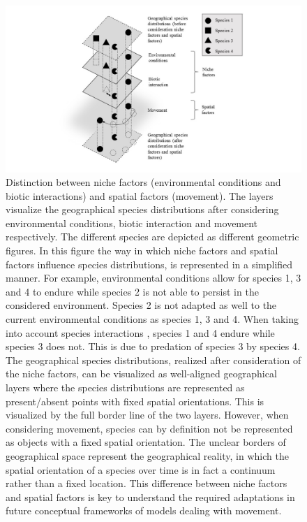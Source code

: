 \documentclass[12pt,authoryear]{elsarticle}
\begin{document}
\begin{figure}[!ht]
  \centering\includegraphics[scale=0.45]{Figure1}
  \caption{Distinction between niche factors (environmental conditions and biotic interactions) and spatial factors (movement). The layers visualize the geographical species distributions after considering environmental conditions, biotic interaction and movement respectively. The different species are depicted as different geometric figures. In this figure the way in which niche factors and spatial factors influence species distributions, is represented in a simplified manner. For example, environmental conditions allow for species 1, 3 and 4 to endure while species 2 is not able to persist in the considered environment. Species 2 is not adapted as well to the current environmental conditions as species 1, 3 and 4. When taking into account species interactions , species 1 and 4 endure while species 3 does not. This is due to predation of species 3 by species 4. The geographical species distributions, realized after consideration of the niche factors, can be visualized as well-aligned geographical layers where the species distributions are represented as present/absent points with fixed spatial orientations. This is visualized by the full border line of the two layers. However, when considering movement, species can by definition not be represented as objects with a fixed spatial orientation. The unclear borders of geographical space represent the geographical reality, in which the spatial orientation of a species over time is in fact a continuum rather than a fixed location. This difference between niche factors and spatial factors is key to understand the required adaptations in future conceptual frameworks of models dealing with movement.}
  \label{fig:Figure1}
\end{figure}
\end{document}
